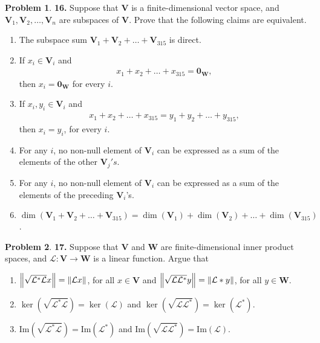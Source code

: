 \documentclass{book}
\theoremstyle{definition}
\newtheorem*{prob*}{Problem}
\newcommand{\V}{\mathbf{V}}
\newcommand{\W}{\mathbf{W}}
\newcommand{\lag}{\mathcal{L}}
\newcommand{\ima}{\text{Im}}
\begin{document}
\begin{prob*}\textbf{16.} Suppose that $\V$ is a finite-dimensional vector space, and $\V_1, \V_2,\dots,\V_n$ are subspaces of $\V$. Prove that the following claims are equivalent. 
	
	\begin{enumerate}
		\item The subspace sum $\V_1 + \V_2 + \dots + \V_{315}$ is direct. 
		
		\item If $x_i \in \V_i$ and 
		\begin{align*}
		x_1 + x_2 + \dots + x_{315} = \mathbf{0}_\W,
		\end{align*}
		then $x_i = \mathbf{0}_{\W}$ for every $i$.
		
		
		
		\item If $x_i, y_i \in \V_i$ and 
		\begin{align*}
		x_1 + x_2 + \dots + x_{315} = y_1 + y_2 + \dots + y_{315},
		\end{align*}
		then $x_i = y_i$, for every $i$. 
		
		
		\item For any $i$, no non-null element of $\V_i$ can be expressed as a sum of the elements of the other $\V_j's$.
		
		\item For any $i$, no non-null element of $\V_i$ can be expressed as a sum of the elements of the preceding $\V_i$'s.
		
		\item $\dim(\V_1 + \V_2 + \dots + \V_{315}) = \dim(\V_1) + \dim(\V_2) + \dots + \dim(\V_{315})$.
	\end{enumerate}
	
\end{prob*}




\newpage



\begin{prob*}\textbf{17.} Suppose that $\V$ and $\W$ are finite-dimensional inner product spaces, and $\lag : \V \to \W$ is a linear function. Argue that 
	
	\begin{enumerate}
		\item $\norm{\sqrt{\lag^*\lag} x} = \norm{\lag x}$, for all $x\in \V$ and $\norm{\sqrt{\lag\lag^*} y} = \norm{\lag* y}$, for all $y\in \W$.
		
		
		\item $\ker(\sqrt{\lag^*\lag}) = \ker(\lag)$ and $\ker(\sqrt{\lag\lag^*}) = \ker(\lag^*)$.
		
		
		\item $\ima(\sqrt{\lag^*\lag}) = \ima(\lag^*)$ and $\ima(\sqrt{\lag\lag^*}) = \ima(\lag)$. 
	\end{enumerate}
	
\end{prob*}
\end{document}
